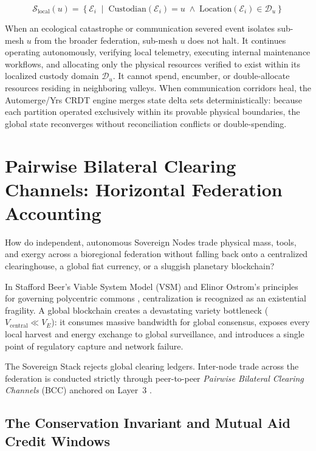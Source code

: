 \begin{equation}
\mathcal{S}_{\mathrm{local}}(u) = \left\{ \mathcal{E}_i \;\middle|\; \mathrm{Custodian}(\mathcal{E}_i) = u \;\land\; \mathrm{Location}(\mathcal{E}_i) \in \mathcal{D}_u \right\}
\label{eq:ch4_local_shard}
\end{equation}

When an ecological catastrophe or communication severed event isolates sub-mesh $u$ from the broader federation, sub-mesh $u$ does not halt. It continues operating autonomously, verifying local telemetry, executing internal maintenance workflows, and allocating only the physical resources verified to exist within its localized custody domain $\mathcal{D}_u$. It cannot spend, encumber, or double-allocate resources residing in neighboring valleys. When communication corridors heal, the Automerge/Yrs CRDT engine merges state delta sets deterministically: because each partition operated exclusively within its provable physical boundaries, the global state reconverges without reconciliation conflicts or double-spending.

\section{Pairwise Bilateral Clearing Channels: Horizontal Federation Accounting}
\label{sec:l3-bcc}

How do independent, autonomous Sovereign Nodes trade physical mass, tools, and exergy across a bioregional federation without falling back onto a centralized clearinghouse, a global fiat currency, or a sluggish planetary blockchain?

In Stafford Beer's Viable System Model (VSM) \parencite{beer1972} and Elinor Ostrom's principles for governing polycentric commons \parencite{ostrom1990}, centralization is recognized as an existential fragility. A global blockchain creates a devastating variety bottleneck ($V_{\mathrm{central}} \ll V_E$): it consumes massive bandwidth for global consensus, exposes every local harvest and energy exchange to global surveillance, and introduces a single point of regulatory capture and network failure.

The Sovereign Stack rejects global clearing ledgers. Inter-node trade across the federation is conducted strictly through peer-to-peer \textit{Pairwise Bilateral Clearing Channels} (BCC) anchored on Layer~3 \parencite{grigg2004}.

\subsection{The Conservation Invariant and Mutual Aid Credit Windows}

